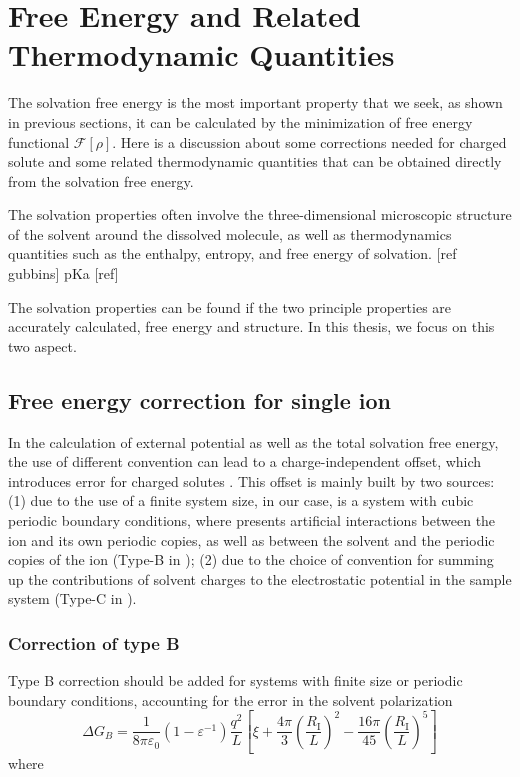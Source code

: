 
\chapter{Free Energy and Related Thermodynamic Quantities\label{chpt:thermodynamic-quantities}}

The solvation free energy is the most important property that we seek,
as shown in previous sections, it can be calculated by the minimization
of free energy functional $\mathcal{F}[\rho]$. Here is a discussion
about some corrections needed for charged solute and some related
thermodynamic quantities that can be obtained directly from the solvation
free energy.

The solvation properties often involve the three-dimensional microscopic
structure of the solvent around the dissolved molecule, as well as
thermodynamics quantities such as the enthalpy, entropy, and free
energy of solvation. {[}ref gubbins{]} pKa {[}ref{]}

The solvation properties can be found if the two principle properties
are accurately calculated, free energy and structure. In this thesis,
we focus on this two aspect.


\section{Free energy correction for single ion}

In the calculation of external potential as well as the total solvation
free energy, the use of different convention can lead to a charge-independent
offset, which introduces error for charged solutes \citep{Kastenholz_2006_I,Kastenholz_2006_II,Hunenberger_book}.
This offset is mainly built by two sources: (1) due to the use of
a finite system size, in our case, is a system with cubic periodic
boundary conditions, where presents artificial interactions between
the ion and its own periodic copies, as well as between the solvent
and the periodic copies of the ion (Type-B in \citep{Kastenholz_2006_II});
(2) due to the choice of convention for summing up the contributions
of solvent charges to the electrostatic potential in the sample system
(Type-C in \citep{Kastenholz_2006_II}).


\subsection{Correction of type B}

Type B correction should be added for systems with finite size or
periodic boundary conditions, accounting for the error in the solvent
polarization 
\begin{equation}
\Delta G_{B}=\frac{1}{8\pi\varepsilon_{0}}\left(1-\varepsilon^{-1}\right)\frac{q^{2}}{L}\left[\xi+\frac{4\pi}{3}\left(\frac{R_{\mathrm{I}}}{L}\right)^{2}-\frac{16\pi}{45}\left(\frac{R_{\mathrm{I}}}{L}\right)^{5}\right]\label{eq:corr-B}
\end{equation}
where

